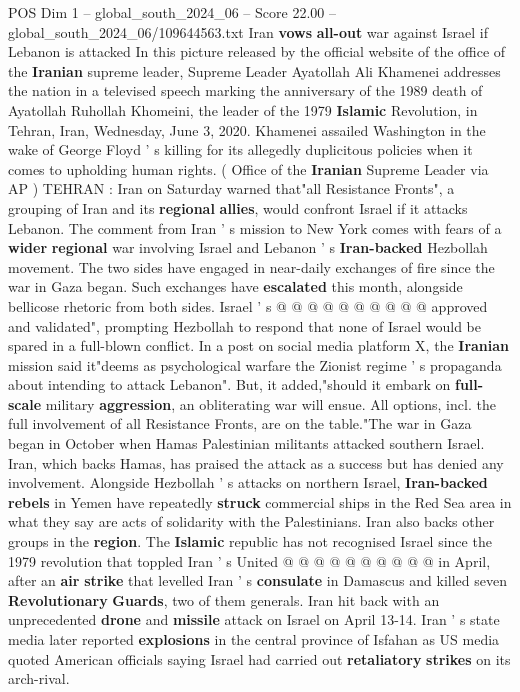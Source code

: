 \begin{textsample}{POS Dim 1 – global\_south\_2024\_06 – Score 22.00 – global\_south\_2024\_06/109644563.txt}  \label{ex:f1_pos_133}
Iran \textbf{vows} \textbf{all-out} war against Israel if Lebanon is attacked In this picture released by the official website of the office of the \textbf{Iranian} supreme leader, Supreme Leader Ayatollah Ali Khamenei addresses the nation in a televised speech marking the anniversary of the 1989 death of Ayatollah Ruhollah Khomeini, the leader of the 1979 \textbf{Islamic} Revolution, in Tehran, Iran, Wednesday, June 3, 2020.
Khamenei assailed Washington in the wake of George Floyd ' s killing for its allegedly duplicitous policies when it comes to upholding human rights. ( Office of the \textbf{Iranian} Supreme Leader via AP ) TEHRAN : Iran on Saturday warned that"all Resistance Fronts", a grouping of Iran and its \textbf{regional} \textbf{allies}, would confront Israel if it attacks Lebanon.
The comment from Iran ' s mission to New York comes with fears of a \textbf{wider} \textbf{regional} war involving Israel and Lebanon ' s \textbf{Iran-backed} Hezbollah movement.
The two sides have engaged in near-daily exchanges of fire since the war in Gaza began.
Such exchanges have \textbf{escalated} this month, alongside bellicose rhetoric from both sides.
Israel ' s @ @ @ @ @ @ @ @ @ @ approved and validated", prompting Hezbollah to respond that none of Israel would be spared in a full-blown conflict.
In a post on social media platform X, the \textbf{Iranian} mission said it"deems as psychological warfare the Zionist regime ' s propaganda about intending to attack Lebanon".
But, it added,"should it embark on \textbf{full-scale} military \textbf{aggression}, an obliterating war will ensue.
All options, incl. the full involvement of all Resistance Fronts, are on the table."The war in Gaza began in October when Hamas Palestinian militants attacked southern Israel.
Iran, which backs Hamas, has praised the attack as a success but has denied any involvement.
Alongside Hezbollah ' s attacks on northern Israel, \textbf{Iran-backed} \textbf{rebels} in Yemen have repeatedly \textbf{struck} commercial ships in the Red Sea area in what they say are acts of solidarity with the Palestinians.
Iran also backs other groups in the \textbf{region}.
The \textbf{Islamic} republic has not recognised Israel since the 1979 revolution that toppled Iran ' s United @ @ @ @ @ @ @ @ @ @ in April, after an \textbf{air} \textbf{strike} that levelled Iran ' s \textbf{consulate} in Damascus and killed seven \textbf{Revolutionary} \textbf{Guards}, two of them generals.
Iran hit back with an unprecedented \textbf{drone} and \textbf{missile} attack on Israel on April 13-14.
Iran ' s state media later reported \textbf{explosions} in the central province of Isfahan as US media quoted American officials saying Israel had carried out \textbf{retaliatory} \textbf{strikes} on its arch-rival.

\end{textsample}
